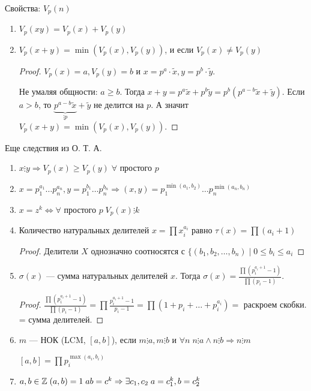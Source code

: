 Свойства: $V_p(n)$
 \begin{enumerate}
     \item $V_p(xy) = V_p(x) + V_p(y)$
     \item  $V_p(x+y) = \min(V_p(x), V_p(y))$, и если $V_p(x) \neq V_p(y)$ 
         \begin{proof}
             $V_p(x)= a, V_p(y) = b$ и  $x = p^a \cdot \widetilde{x}, y = p^b \cdot \widetilde{y}$.

             Не умаляя общности:  $a \ge b$. Тогда $x+y = p^a \widetilde{x} + p^b \widetilde{y} = p^b(p^{a-b} \widetilde{x} + \widetilde{y})$. Если  $a > b$, то  $\underbrace{p^{a-b} \widetilde{x}}_{\vdots p} + \widetilde{y}$ не делится на $p$. А значит $V_p(x+y) = \min(V_p(x), V_p(y))$.
         \end{proof}
\end{enumerate}
Еще следствия из О. Т. А.
\begin{enumerate}
    \item $x \vdots y \Rightarrow V_p(x) \ge V_p(y) \; \forall\text{ простого }p$
    \item $x = p_1^{a_1} \ldots p_n^{a_n}, y = p_1^{b_1} \ldots p_n ^ {b_n} \Rightarrow (x,y) = p_1^{\min(a_1, b_2)} \ldots p_n ^ {\min(a_n, b_n)}$
    \item $x = z^k \iff \forall\text{ простого } p \; V_p(x) \vdots k$
    \item Количество натуральных делителей  $x = \prod x_i^{a_i}$ равно  $\tau(x) = \prod (a_i + 1)$
        \begin{proof}
            Делители $X$ однозначно соотносятся с  $\{(b_1, b_2, \ldots, b_n) \mid 0\le b_i \le a_i$ 
        \end{proof}
    \item $\sigma(x)$ --- сумма натуральных делителей  $x$. Тогда  $\sigma(x) =  \frac{\prod(p_{i}^{a_i + 1} - 1)}{\prod (p_i - 1)}$.
        \begin{proof}
            $\frac{\prod(p_{i}^{a_i + 1} - 1)}{\prod (p_i - 1)} = \prod \frac{p_{i}^{a_i + 1} - 1}{p_i - 1} = \prod (1 + p_i + \ldots + p_{i}^{a_i}) =$ раскроем скобки. = сумма делителей. 
        \end{proof}
    \item 
        \begin{definition}
            $m$ --- НОК (LCM, $[a, b]$), если $m \vdots a, m \vdots b$ и  $\forall n\; n \vdots a \land n \vdots b \Rightarrow n \vdots m$
        \end{definition}
        $[a,b] = \prod p_{i}^{\max(a_i, b_i)}$
    \item $a, b \in \mathbb{Z} \; (a, b) = 1 \; ab = c^k \Rightarrow \exists c_1, c_2 \; a = c_{1}^k, b = c_{2}^k$
\end{enumerate}
